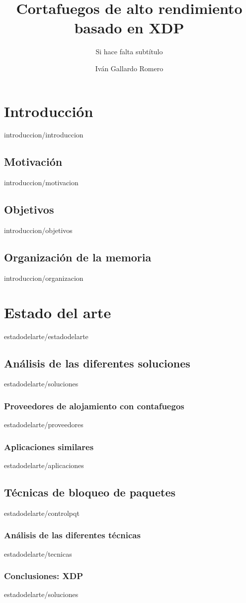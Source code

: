 \documentclass[epsbased,copyright,final,printable,covers,extendedindex,firstnumbered,tfg,gnuplot]{tfgtfmthesisuam}
\title{Cortafuegos de alto rendimiento basado en XDP}
\subtitle{Si hace falta subtítulo}
\author{Iván Gallardo Romero}
\begin{document}
\chapter{Introducción\label{CAP:INTRODUCCION}}{introduccion/introduccion}
 \section{Motivación\label{SEC:MOTIVACION}}{introduccion/motivacion}
 \section{Objetivos\label{SEC:OBJETIVOS}}{introduccion/objetivos}
 \section{Organización de la memoria\label{SEC:ORGANIZACION}}{introduccion/organizacion}
 
 
\chapter{Estado del arte\label{CAP:ESTADODELARTE}}{estadodelarte/estadodelarte}
    \section{Análisis de las diferentes soluciones\label{SEC:SOLUCIONES}}{estadodelarte/soluciones}
                \subsection{Proveedores de alojamiento con contafuegos\label{SEC:EAAS}}{estadodelarte/proveedores}
                \subsection{Aplicaciones similares\label{SEC:EAaplicacionesS}}{estadodelarte/aplicaciones}
    \section{Técnicas de bloqueo de paquetes\label{SEC:controlpqt}}{estadodelarte/controlpqt}
        \subsection{Análisis de las diferentes técnicas\label{SEC:NETFILTER}}{estadodelarte/tecnicas}
        \subsection{Conclusiones: XDP\label{SEC:CONCLUSIONESXDP}}{estadodelarte/soluciones}
\end{document}
